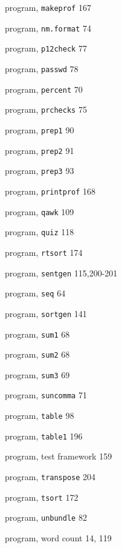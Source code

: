 \begin{multicols}{3}
\hangindent=4pc  program, \verb'makeprof' 167

\hangindent=4pc  program, \verb'nm.format' 74

\hangindent=4pc  program, \verb'p12check' 77

\hangindent=4pc  program, \verb'passwd' 78

\hangindent=4pc  program, \verb'percent' 70

\hangindent=4pc  program, \verb'prchecks' 75

\hangindent=4pc  program, \verb'prep1' 90

\hangindent=4pc  program, \verb'prep2' 91

\hangindent=4pc  program, \verb'prep3' 93

\hangindent=4pc  program, \verb'printprof' 168

\hangindent=4pc  program, \verb'qawk' 109

\hangindent=4pc  program, \verb'quiz' 118

\hangindent=4pc  program, \verb'rtsort' 174

\hangindent=4pc  program, \verb'sentgen' 115,200-201

\hangindent=4pc  program, \verb'seq' 64

\hangindent=4pc  program, \verb'sortgen' 141

\hangindent=4pc  program, \verb'sum1' 68

\hangindent=4pc  program, \verb'sum2' 68

\hangindent=4pc  program, \verb'sum3' 69



\hangindent=4pc  program, \verb'suncomma' 71

\hangindent=4pc  program, \verb'table' 98

\hangindent=4pc  program, \verb'table1' 196

\hangindent=4pc  program, test framework 159

\hangindent=4pc  program, \verb'transpose' 204

\hangindent=4pc  program, \verb'tsort' 172

\hangindent=4pc  program, \verb'unbundle' 82

\hangindent=4pc  program, word count 14, 119


\end{multicols}
